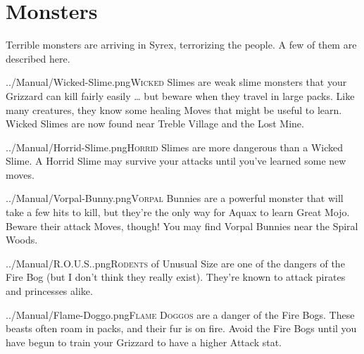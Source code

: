 \documentclass[10pt,twocolumn,openany,article]{memoir}
\begin{document}
\columnbreak
\chapter{Monsters}

Terrible monsters are  arriving in Syrex, terrorizing the  people. A few
of them are described here.

\vspace{14pt}

\lettrine[image=true,                lines=5,               findent=3pt,
nindent=3pt]{../Manual/Wicked-Slime.png}{Wicked}  Slimes are  weak slime
monsters that  your Grizzard can  kill fairly  easily … but  beware when
they travel in large packs. Like  many creatures, they know some healing
Moves that  might be useful to  learn. Wicked Slimes are  now found near
Treble Village and the Lost Mine.

\vspace{14pt}

\lettrine[image=true,                lines=5,               findent=3pt,
nindent=3pt]{../Manual/Horrid-Slime.png}{Horrid}    Slimes   are    more
dangerous than a  Wicked Slime. A Horrid Slime may  survive your attacks
until you've learned some new moves.

\vspace{14pt}

\lettrine[image=true,                lines=5,               findent=3pt,
nindent=3pt]{../Manual/Vorpal-Bunny.png}{Vorpal} Bunnies  are a powerful
monster that will take a few hits  to kill, but they're the only way for
Aquax to  learn Great Mojo. Beware  their attack Moves, though!  You may
find Vorpal Bunnies near the Spiral Woods.

\vspace{14pt}

\lettrine[image=true,                lines=5,               findent=3pt,
nindent=3pt]{../Manual/R.O.U.S..png}{Rodents} of Unusual Size are one of
the  dangers of  the Fire  Bog (but  I don't  think they  really exist).
They're known to attack pirates and princesses alike.

\vspace{14pt}

\lettrine[image=true,                lines=5,               findent=3pt,
nindent=3pt]{../Manual/Flame-Doggo.png}{Flame  Doggos} are  a danger  of
the Fire  Bogs. These beasts  often roam in packs,  and their fur  is on
fire. Avoid the Fire Bogs until you have begun to train your Grizzard to
have a higher Attack stat.
\end{document}
